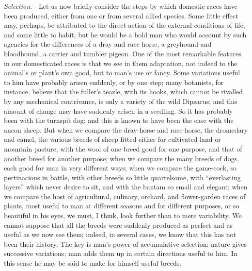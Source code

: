 \documentclass{book}
\begin{document}
\emph{Selection}.---Let us now briefly consider the steps by which
domestic races have been produced, either from one or from several allied
species. Some little effect may, perhaps, be attributed to the direct action of
the external conditions of life, and some little to habit; but he would be a
bold man who would account by such agencies for the differences of a dray and
race horse, a greyhound and bloodhound, a carrier and tumbler pigeon. One of
the most remarkable features in our domesticated races
is that we see in them adaptation, not indeed to the animal's or
plant's own good, but to man's use or fancy. Some variations useful
to him have probably arisen suddenly, or by one step; many botanists, for
instance, believe that the fuller's teazle, with its hooks, which cannot
be rivalled by any mechanical contrivance, is only a variety of the wild
Dipsacus; and this amount of change may have suddenly arisen in a seedling. So
it has probably been with the turnspit dog; and this is known to have been the
case with the ancon sheep. But when we compare the dray-horse and race-horse,
the dromedary and camel, the various breeds of sheep fitted either for
cultivated land or mountain pasture, with the wool of one breed good for one
purpose, and that of another breed for another purpose; when we compare the
many breeds of dogs, each good for man in very different ways; when we compare
the game-cock, so pertinacious in battle, with other breeds so little
quarrelsome, with ``everlasting layers'' which never desire to sit,
and with the bantam so small and elegant; when we compare the host of
agricultural, culinary, orchard, and flower-garden races of plants, most useful
to man at different seasons and for different purposes, or so beautiful in his
eyes, we must, I think, look further than to mere variability. We cannot
suppose that all the breeds were suddenly produced as perfect and as useful as
we now see them; indeed, in several cases, we know that this has not been their
history. The key is man's power of accumulative selection: nature gives
successive variations; man adds them up in certain directions useful to him. In
this sense he may be said to make for himself useful breeds.
\end{document}

